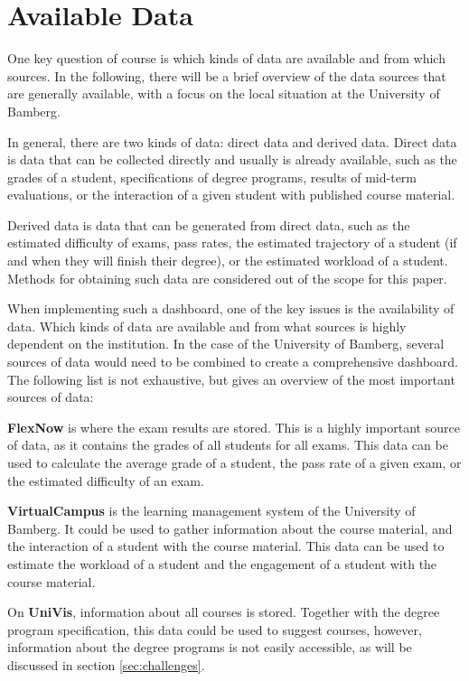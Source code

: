 \section{Available Data}
\label{sec:data}

One key question of course is which kinds of data are available and from which sources. In the following, there will be a brief overview of the data sources that are generally available, with a focus on the local situation at the University of Bamberg.

In general, there are two kinds of data: direct data and derived data. Direct data is data that can be collected directly and usually is already available, such as the grades of a student, specifications of degree programs, results of mid-term evaluations, or the interaction of a given student with published course material.

Derived data is data that can be generated from direct data, such as the estimated difficulty of exams, pass rates, the estimated trajectory of a student (if and when they will finish their degree), or the estimated workload of a student. Methods for obtaining such data are considered out of the scope for this paper.

When implementing such a dashboard, one of the key issues is the availability of data. Which kinds of data are available and from what sources is highly dependent on the institution. In the case of the University of Bamberg,  several sources of data would need to be combined to create a comprehensive dashboard. The following list is not exhaustive, but gives an overview of the most important sources of data:

\textbf{FlexNow} is where the exam results are stored. This is a highly important source of data, as it contains the grades of all students for all exams. This data can be used to calculate the average grade of a student, the pass rate of a given exam, or the estimated difficulty of an exam.

\textbf{VirtualCampus} is the learning management system of the University of Bamberg. It could be used to gather information about the course material, and the interaction of a student with the course material. This data can be used to estimate the workload of a student and the engagement of a student with the course material.

On \textbf{UniVis}, information about all courses is stored. Together with the degree program specification, this data could be used to suggest courses, however, information about the degree programs is not easily accessible, as will be discussed in section \ref{sec:challenges}.